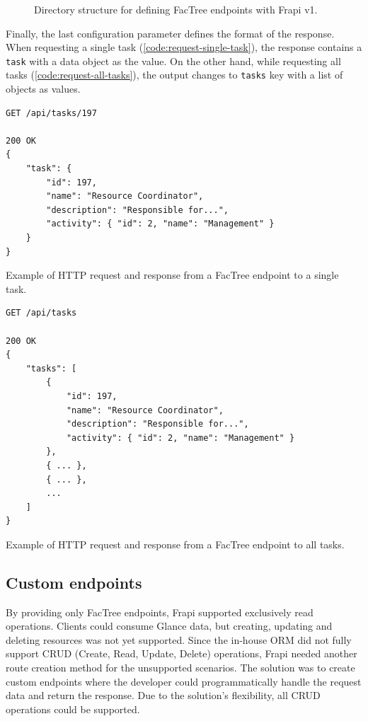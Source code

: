 \begin{figure}
\centering
\begin{minipage}{0.9\textwidth}
\end{minipage}
\caption{Directory structure for defining FacTree endpoints with Frapi v1.}
\label{fig:frapi-v1-factree-dir}
\end{figure}

Finally, the last configuration parameter defines the format of the response. When requesting a single task (\autoref{code:request-single-task}), the response contains a \texttt{task} with a data object as the value. On the other hand, while requesting all tasks (\autoref{code:request-all-tasks}), the output changes to \texttt{tasks} key with a list of objects as values.

\begin{listing}[htbp]
\begin{verbatim}
GET /api/tasks/197

200 OK
{
	"task": {
		"id": 197,
		"name": "Resource Coordinator",
		"description": "Responsible for...",
		"activity": { "id": 2, "name": "Management" }
	}
}
\end{verbatim}
\caption{Example of HTTP request and response from a FacTree endpoint to a single task.}
\label{code:request-single-task}
\end{listing}

\begin{listing}[htbp]
\begin{verbatim}
GET /api/tasks

200 OK
{
	"tasks": [
		{
			"id": 197,
			"name": "Resource Coordinator",
			"description": "Responsible for...",
			"activity": { "id": 2, "name": "Management" }
		},
		{ ... },
		{ ... },
		...
	]
}
\end{verbatim}
\caption{Example of HTTP request and response from a FacTree endpoint to all tasks.}
\label{code:request-all-tasks}
\end{listing}

\subsection{Custom endpoints}
\label{sec:custom-endpoints}

By providing only FacTree endpoints, Frapi supported exclusively read operations. Clients could consume Glance data, but creating, updating and deleting resources was not yet supported. Since the in-house ORM did not fully support CRUD (Create, Read, Update, Delete) operations, Frapi needed another route creation method for the unsupported scenarios. The solution was to create custom endpoints where the developer could programmatically handle the request data and return the response. Due to the solution's flexibility, all CRUD operations could be supported.

